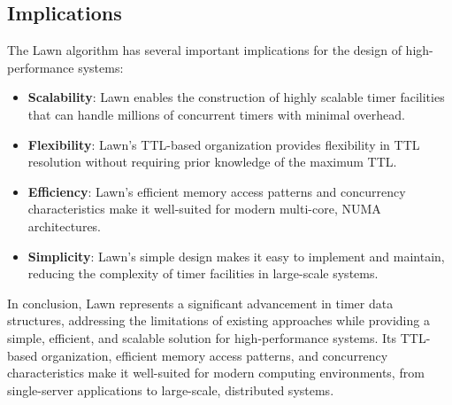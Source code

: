 \documentclass[conference]{IEEEtran}
\begin{document}
\subsection{Implications}
The Lawn algorithm has several important implications for the design of high-performance systems:

\begin{itemize}
    \item \textbf{Scalability}: Lawn enables the construction of highly scalable timer facilities that can handle millions of concurrent timers with minimal overhead.
    
    \item \textbf{Flexibility}: Lawn's TTL-based organization provides flexibility in TTL resolution without requiring prior knowledge of the maximum TTL.
    
    \item \textbf{Efficiency}: Lawn's efficient memory access patterns and concurrency characteristics make it well-suited for modern multi-core, NUMA architectures.
    
    \item \textbf{Simplicity}: Lawn's simple design makes it easy to implement and maintain, reducing the complexity of timer facilities in large-scale systems.
\end{itemize}

In conclusion, Lawn represents a significant advancement in timer data structures, addressing the limitations of existing approaches while providing a simple, efficient, and scalable solution for high-performance systems. Its TTL-based organization, efficient memory access patterns, and concurrency characteristics make it well-suited for modern computing environments, from single-server applications to large-scale, distributed systems.




\end{document}
